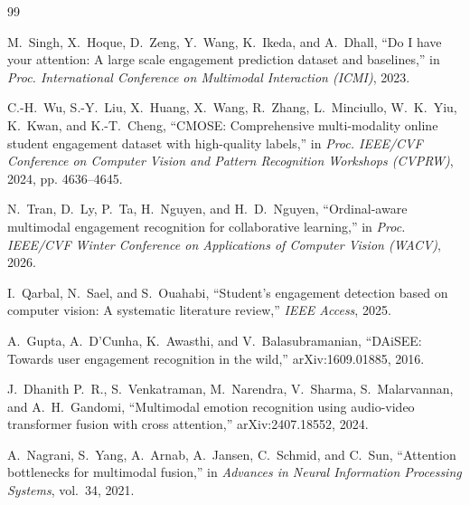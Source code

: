 \documentclass[journal]{IEEEtran}
\begin{document}
%
%
%
\begin{thebibliography}{99}

M.~Singh, X.~Hoque, D.~Zeng, Y.~Wang, K.~Ikeda, and A.~Dhall, ``Do I have your attention: A large scale engagement prediction dataset and baselines,'' in \emph{Proc. International Conference on Multimodal Interaction (ICMI)}, 2023.

C.-H.~Wu, S.-Y.~Liu, X.~Huang, X.~Wang, R.~Zhang, L.~Minciullo, W.~K.~Yiu, K.~Kwan, and K.-T.~Cheng, ``CMOSE: Comprehensive multi-modality online student engagement dataset with high-quality labels,'' in \emph{Proc. IEEE/CVF Conference on Computer Vision and Pattern Recognition Workshops (CVPRW)}, 2024, pp. 4636--4645.

N.~Tran, D.~Ly, P.~Ta, H.~Nguyen, and H.~D.~Nguyen, ``Ordinal-aware multimodal engagement recognition for collaborative learning,'' in \emph{Proc. IEEE/CVF Winter Conference on Applications of Computer Vision (WACV)}, 2026.

I.~Qarbal, N.~Sael, and S.~Ouahabi, ``Student's engagement detection based on computer vision: A systematic literature review,'' \emph{IEEE Access}, 2025.

A.~Gupta, A.~D'Cunha, K.~Awasthi, and V.~Balasubramanian, ``DAiSEE: Towards user engagement recognition in the wild,'' arXiv:1609.01885, 2016.

J.~Dhanith P.~R., S.~Venkatraman, M.~Narendra, V.~Sharma, S.~Malarvannan, and A.~H.~Gandomi, ``Multimodal emotion recognition using audio-video transformer fusion with cross attention,'' arXiv:2407.18552, 2024.

A.~Nagrani, S.~Yang, A.~Arnab, A.~Jansen, C.~Schmid, and C.~Sun, ``Attention bottlenecks for multimodal fusion,'' in \emph{Advances in Neural Information Processing Systems}, vol.~34, 2021.


\end{thebibliography}
\end{document}
